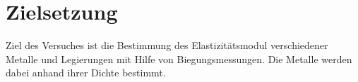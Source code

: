 \section{Zielsetzung}
\label{sec:Zielsetzung}
Ziel des Versuches ist die Bestimmung des Elastizitätsmodul verschiedener Metalle und Legierungen mit Hilfe von Biegungsmessungen.
Die Metalle werden dabei anhand ihrer Dichte bestimmt.